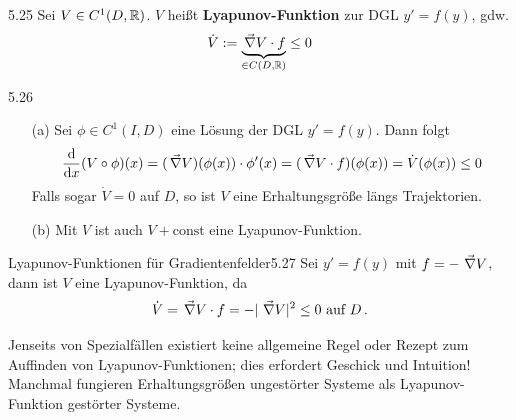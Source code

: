 \documentclass[a4paper]{article}
\begin{document}
\begin{Def}{}{5.25}
Sei $V\in C^1(D,\mathbb R)$. $V$ heißt \textbf{Lyapunov-Funktion} zur DGL $y'=f(y)$, gdw.
\[\dot{V}:=\underbrace{\mathop{}\Vec{\nabla} V\cdot f}_{\in C(D,\mathbb R)}\le 0\]
\end{Def}

\begin{Bemerkung}{}{5.26}
\begin{itemize}
\item[(a)] Sei $\phi\in C^1(I,D)$ eine Lösung der DGL $y'=f(y)$. Dann folgt
\[\frac{\mathop{}\!\mathrm{d} }{\mathop{}\!\mathrm{d} x}(V\circ \phi)(x)=(\mathop{}\Vec{\nabla} V)(\phi(x))\cdot\phi'(x)=(\mathop{}\Vec{\nabla} V\cdot f)(\phi(x))=\dot{V}(\phi(x))\le 0\]
Falls sogar $\dot{V}=0$ auf $D$, so ist $V$ eine Erhaltungsgröße längs Trajektorien.
\item[(b)] Mit $V$ ist auch $V+\mathrm{const}$ eine Lyapunov-Funktion.
\end{itemize}
\end{Bemerkung}

\begin{Beispiel}{Lyapunov-Funktionen für Gradientenfelder}{5.27}
 Sei $y'=f(y)$ mit $f=-\mathop{}\Vec{\nabla} V$, dann ist $V$ eine Lyapunov-Funktion, da 
 \[\dot V=\mathop{}\Vec{\nabla} V\cdot f=-|\mathop{}\Vec{\nabla} V|^2\le 0 \text{ auf } D\,.\]
\end{Beispiel}

Jenseits von Spezialfällen existiert keine allgemeine Regel oder Rezept zum Auffinden von Lyapunov-Funktionen; dies erfordert Geschick und Intuition! Manchmal fungieren Erhaltungsgrößen ungestörter Systeme als Lyapunov-Funktion gestörter Systeme.
\end{document}
